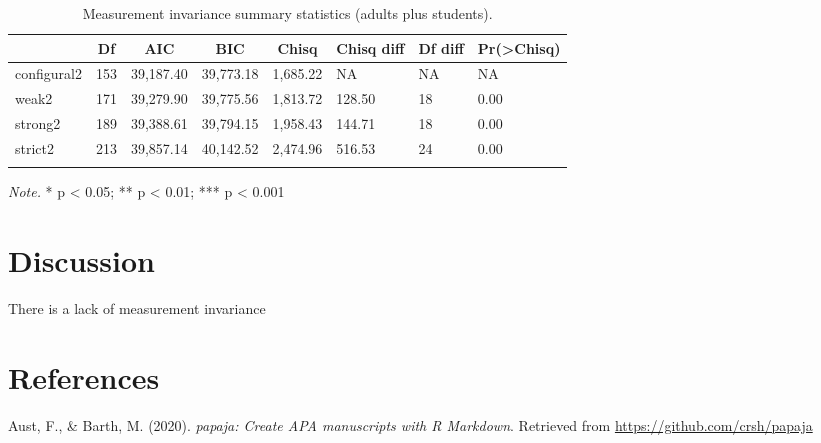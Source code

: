 \documentclass[
  english,
  man]{apa6}
\begin{document}
\begin{table}[tbp]

\begin{center}
\begin{threeparttable}

\caption{\label{tab:measinv2}Measurement invariance summary statistics (adults plus students).}

\begin{tabular}{llllllll}
\toprule
 & \multicolumn{1}{c}{Df} & \multicolumn{1}{c}{AIC} & \multicolumn{1}{c}{BIC} & \multicolumn{1}{c}{Chisq} & \multicolumn{1}{c}{Chisq diff} & \multicolumn{1}{c}{Df diff} & \multicolumn{1}{c}{Pr(>Chisq)}\\
\midrule
configural2 & 153 & 39,187.40 & 39,773.18 & 1,685.22 & NA & NA & NA\\
weak2 & 171 & 39,279.90 & 39,775.56 & 1,813.72 & 128.50 & 18 & 0.00\\
strong2 & 189 & 39,388.61 & 39,794.15 & 1,958.43 & 144.71 & 18 & 0.00\\
strict2 & 213 & 39,857.14 & 40,142.52 & 2,474.96 & 516.53 & 24 & 0.00\\
\bottomrule
\addlinespace
\end{tabular}

\begin{tablenotes}[para]
\normalsize{\textit{Note.} * p < 0.05; ** p < 0.01; *** p < 0.001}
\end{tablenotes}

\end{threeparttable}
\end{center}

\end{table}

\hypertarget{discussion}{%
\section{Discussion}\label{discussion}}

There is a lack of measurement invariance
\newpage

\hypertarget{references}{%
\section{References}\label{references}}

\begingroup
\setlength{\parindent}{-0.5in}
\setlength{\leftskip}{0.5in}

\hypertarget{refs}{}
\leavevmode\hypertarget{ref-R-papaja}{}%
Aust, F., \& Barth, M. (2020). \emph{papaja: Create APA manuscripts with R Markdown}. Retrieved from \url{https://github.com/crsh/papaja}
\end{document}
